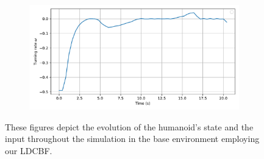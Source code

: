 \begin{figure}[H]
\begin{subfigure}{0.45\linewidth}
    \end{subfigure}
    \begin{subfigure}{0.45\linewidth}
        \centering
        \includegraphics[width=\linewidth]{figures/Simulations/sim1circles_delta/evolution_3.pdf}
    \end{subfigure}
    \caption{These figures depict the evolution of the humanoid's state and the input throughout the simulation in the base environment employing our LDCBF.}
    \label{fig:sim1_delta_evol}
\end{figure}

